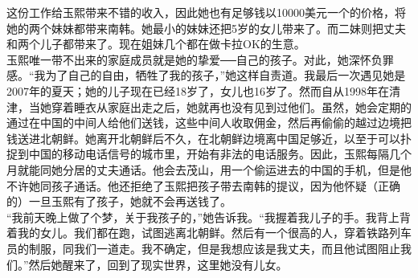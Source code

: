 这份工作给玉熙带来不错的收入，因此她也有足够钱以10000美元一个的价格，将她的两个妹妹都带来南韩。她最小的妹妹还把5岁的女儿带来了。而二妹则把丈夫和两个儿子都带来了。现在姐妹几个都在做卡拉OK的生意。\\

玉熙唯一带不出来的家庭成员就是她的挚爱──自己的孩子。对此，她深怀负罪感。“我为了自己的自由，牺牲了我的孩子，”她这样自责道。我最后一次遇见她是2007年的夏天；她的儿子现在已经18岁了，女儿也16岁了。然而自从1998年在清津，当她穿着睡衣从家庭出走之后，她就再也没有见到过他们。虽然，她会定期的通过在中国的中间人给他们送钱，这些中间人收取佣金，然后再偷偷的越过边境把钱送进北朝鲜。她离开北朝鲜后不久，在北朝鲜边境离中国足够近，以至于可以扑捉到中国的移动电话信号的城市里，开始有非法的电话服务。因此，玉熙每隔几个月就能同她分居的丈夫通话。他会去茂山，用一个偷运进去的中国的手机，但是他不许她同孩子通话。他还拒绝了玉熙把孩子带去南韩的提议，因为他怀疑（正确的）一旦玉熙有了孩子，她就不会再送钱了。\\

“我前天晚上做了个梦，关于我孩子的，”她告诉我。“我握着我儿子的手。我背上背着我的女儿。我们都在跑，试图逃离北朝鲜。然后有一个很高的人，穿着铁路列车员的制服，同我们一道走。我不确定，但是我想应该是我丈夫，而且他试图阻止我们。”然后她醒来了，回到了现实世界，这里她没有儿女。\\
